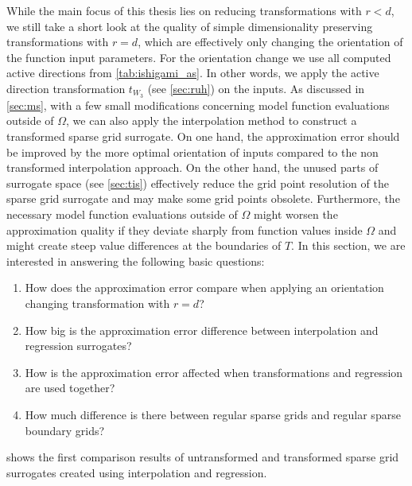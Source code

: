 \documentclass[
  a4paper,  %
  twoside,  %
  bibliography=totoc,
  headsepline,
  cleardoublepage=empty,
  parskip=half,
  draft=false
]{scrbook}
\begin{document}
While the main focus of this thesis lies on reducing transformations with $r < d$, we still take a short look at the quality of simple dimensionality preserving transformations with $r=d$, which are effectively only changing the orientation of the function input parameters.
For the orientation change we use all computed active directions from \cref{tab:ishigami_as}.
In other words, we apply the active direction transformation $t_{W_3}$ (see \cref{sec:ruh}) on the inputs.
As discussed in \cref{sec:ms}, with a few small modifications concerning model function evaluations outside of $\Omega$, we can also apply the interpolation method to construct a transformed sparse grid surrogate.
On one hand, the approximation error should be improved by the more optimal orientation of inputs compared to the non transformed interpolation approach.
On the other hand, the unused parts of surrogate space (see \cref{sec:tis}) effectively reduce the grid point resolution of the sparse grid surrogate and may make some grid points obsolete.
Furthermore, the necessary model function evaluations outside of $\Omega$ might worsen the approximation quality if they deviate sharply from function values inside $\Omega$ and might create steep value differences at the boundaries of $T$.
In this section, we are interested in answering the following basic questions:
\begin{enumerate}
\item How does the approximation error compare when applying an orientation changing transformation with $r=d$?
\item How big is the approximation error difference between interpolation and regression surrogates?
\item How is the approximation error affected when transformations and regression are used together?
\item How much difference is there between regular sparse grids and regular sparse boundary grids?
\end{enumerate}
 shows the first comparison results of untransformed and transformed sparse grid surrogates created using interpolation and regression.
\end{document}
